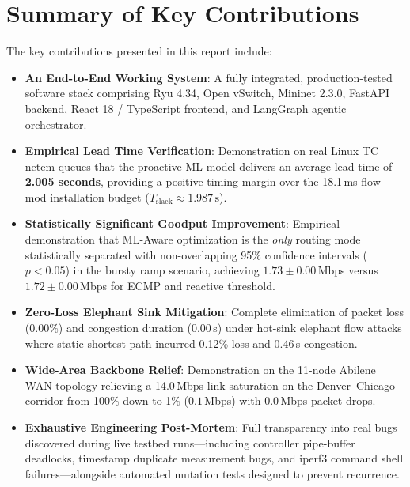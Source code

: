 \section{Summary of Key Contributions}
The key contributions presented in this report include:
\begin{itemize}[leftmargin=1.5em]
  \item \textbf{An End-to-End Working System}: A fully integrated, production-tested software stack comprising Ryu 4.34, Open vSwitch, Mininet 2.3.0, FastAPI backend, React 18 / TypeScript frontend, and LangGraph agentic orchestrator.
  \item \textbf{Empirical Lead Time Verification}: Demonstration on real Linux TC netem queues that the proactive ML model delivers an average lead time of \textbf{2.005 seconds}, providing a positive timing margin over the 18.1\,ms flow-mod installation budget ($T_{\text{slack}} \approx 1.987\,\text{s}$).
  \item \textbf{Statistically Significant Goodput Improvement}: Empirical demonstration that ML-Aware optimization is the \textit{only} routing mode statistically separated with non-overlapping 95\% confidence intervals ($p < 0.05$) in the bursty ramp scenario, achieving $1.73 \pm 0.00$\,Mbps versus $1.72 \pm 0.00$\,Mbps for ECMP and reactive threshold.
  \item \textbf{Zero-Loss Elephant Sink Mitigation}: Complete elimination of packet loss ($0.00\%$) and congestion duration ($0.00$\,s) under hot-sink elephant flow attacks where static shortest path incurred 0.12\% loss and 0.46\,s congestion.
  \item \textbf{Wide-Area Backbone Relief}: Demonstration on the 11-node Abilene WAN topology relieving a 14.0\,Mbps link saturation on the Denver--Chicago corridor from 100\% down to 1\% ($0.1$\,Mbps) with 0.0\,Mbps packet drops.
  \item \textbf{Exhaustive Engineering Post-Mortem}: Full transparency into real bugs discovered during live testbed runs—including controller pipe-buffer deadlocks, timestamp duplicate measurement bugs, and iperf3 command shell failures—alongside automated mutation tests designed to prevent recurrence.
\end{itemize}

